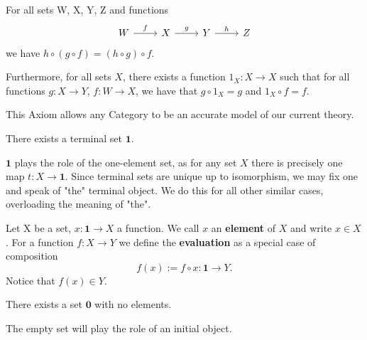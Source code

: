 \begin{axiom}
For all sets W, X, Y, Z and functions
\begin{equation*}
\begin{tikzcd}
W \arrow[r,"f"] & X \arrow[r,"g"] & Y \arrow[r,"h"] & Z 
\end{tikzcd}
\end{equation*}
we have $h \circ (g \circ f) = (h \circ g) \circ f$. 

Furthermore, for all sets $X$, there exists a function $1_{X}: X \longrightarrow X$ such that for all functions $g: X \longrightarrow Y$, $f: W \longrightarrow X$, we have that $g \circ 1_{X} = g$ and $1_{X} \circ f = f$.
\end{axiom}

\begin{remark}
This Axiom allows any Category to be an accurate model of our current theory.
\end{remark}

\begin{axiom}[Elements]
There exists a terminal set $\mathbf{1}$.
\end{axiom}

\begin{remark}
$\mathbf{1}$ plays the role of the one-element set, as for any set $X$ there is precisely one map $t: X \longrightarrow \mathbf{1}$. Since terminal sets are unique up to isomorphism, we may fix one and speak of "the" terminal object. We do this for all other similar cases, overloading the meaning of "the".
\end{remark}

\begin{definition}
Let X be a set, $x: \mathbf{1} \longrightarrow X$ a function. We call $x$ an \textbf{element} of $X$ and write $x \in X$. For a function $f:X \longrightarrow Y$ we define the \textbf{evaluation} as a special case of composition 
\begin{equation*}
f(x) := f \circ x: \mathbf{1} \longrightarrow Y.
\end{equation*}
Notice that $f(x) \in Y$.
\end{definition}

\begin{axiom}
There exists a set $\mathbf{0}$ with no elements.
\end{axiom}

\begin{remark}
The empty set will play the role of an initial object.
\end{remark}

